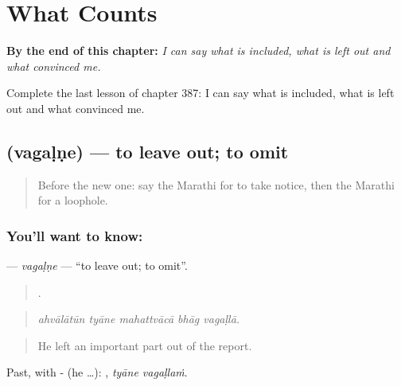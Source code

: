 
\chapter{What Counts}
\label{ch:mr-what-counts}

\begin{chapteropening}
\textbf{By the end of this chapter:} \emph{I can say what is included, what is left out and what convinced me.}

Complete the last lesson of chapter 387: I can say what is included, what is left out and what convinced me.
\end{chapteropening}

\section[\texorpdfstring{\mr{वगळणे} (vagaḷṇe)}{वगळणे (vagaḷṇe)}]{ (vagaḷṇe) — to leave out; to omit}

\label{lesson:MR-C387-vagalne}



\begin{quote}
Before the new one: say the Marathi for to take notice, then the Marathi for a loophole.
\end{quote}

\subsection*{You'll want to know: }
\textbf{} — \emph{vagaḷṇe} — \textquotedblleft{}to leave out; to omit\textquotedblright{}.

\begin{quote}
    .
\end{quote}

\begin{quote}
\emph{ahvālātūn tyāne mahattvācā bhāg vagaḷlā.}
\end{quote}

\begin{quote}
He left an important part out of the report.
\end{quote}

Past, with - (he …):  , \emph{tyāne vagaḷlaṁ}.


